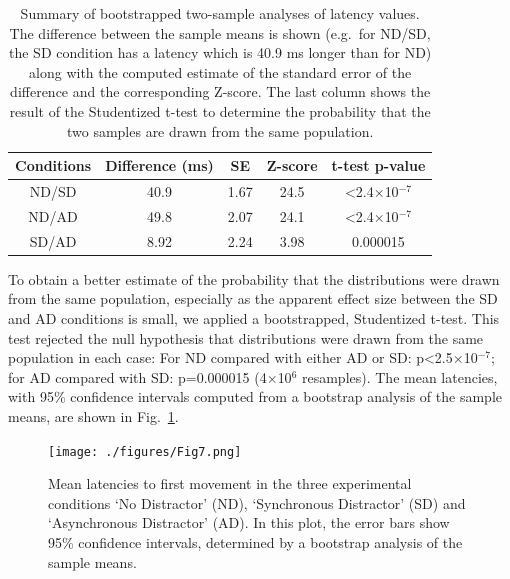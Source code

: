 \documentclass[10pt,letterpaper]{article}
\begin{document}
\begin{table}[ht]
\caption{Summary of bootstrapped two-sample analyses of latency
  values. The difference between the sample means is shown (e.g.~for
  ND/SD, the SD condition has a latency which is 40.9 ms longer than
  for ND) along with the computed estimate of the standard error of
  the difference and the corresponding Z-score. The last column shows
  the result of the Studentized t-test to determine the probability
  that the two samples are drawn from the same population.}
\centering
\begin{tabular}{c c c c c}
\hline
\textbf{Conditions} & \textbf{Difference (ms)} & \textbf{SE} & \textbf{Z-score} & \textbf{t-test p-value} \\ [0.5ex]
\hline
ND/SD & 40.9 & 1.67 & 24.5 & \textless2.4$\times$10$^{-7}$ \\
ND/AD & 49.8 & 2.07 & 24.1 & \textless2.4$\times$10$^{-7}$ \\
SD/AD & 8.92 & 2.24 & 3.98 & 0.000015 \\ [1ex]
\hline
\end{tabular}
\label{table:twosample}
\end{table}

To obtain a better estimate of the probability that the distributions
were drawn from the same population, especially as the apparent effect
size between the SD and AD conditions is small, we applied a
bootstrapped, Studentized t-test. This test rejected the null
hypothesis that distributions were drawn from the same population in
each case: For ND compared with either AD or SD:
p\textless2.5$\times$10$^{-7}$; for AD compared with SD: p=0.000015
(4$\times$10$^{6}$ resamples). The mean latencies, with 95\%
confidence intervals computed from a bootstrap analysis of the sample
means, are shown in Fig.~\ref{meanmad}.

\begin{figure}[htb!]
\centering
\texttt{[image: ./figures/Fig7.png]} %
\caption[Mean latencies] {Mean latencies to first movement in the
  three experimental conditions `No Distractor' (ND), `Synchronous
  Distractor' (SD) and `Asynchronous Distractor' (AD). In this plot,
  the error bars show 95\% confidence intervals, determined by
  a bootstrap analysis of the sample means.}
\label{meanmad}
\end{figure}
\end{document}
